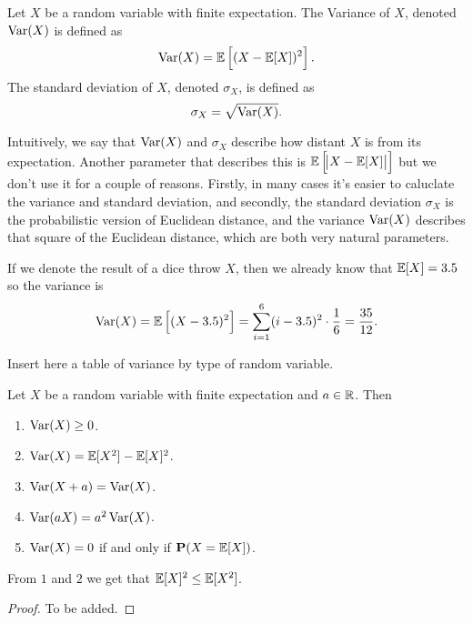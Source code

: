 \documentclass[11pt,a4paper]{article}
\begin{document}
  \begin{definition}
    Let $X$ be a random variable with finite expectation. The Variance of
    $X$, denoted $\operatorname{Var}(X)$ is defined as
    \[
      \operatorname{Var}(X) = \mathbb{E}\left[ (X - \mathbb{E}[X])^2 \right].
    \]
    The standard deviation of $X$, denoted $\sigma_X$, is defined as
    \[
      \sigma_X = \sqrt{\operatorname{Var}(X)}.
    \]
  \end{definition}
  
  Intuitively, we say that $\operatorname{Var}(X)$ and $\sigma_X$ describe how distant $X$
  is from its expectation. Another parameter that describes this is
  $\mathbb{E}\left[ \abs{X - \mathbb{E}[X]} \right]$ but we don't use it
  for a couple of reasons. Firstly, in many cases it's easier to caluclate
  the variance and standard deviation, and secondly, the standard deviation
  $\sigma_X$ is the probabilistic version of Euclidean distance, and the 
  variance $\operatorname{Var}(X)$ describes that square of the Euclidean distance, which
  are both very natural parameters.

  \begin{example}
    If we denote the result of a dice throw $X$, then we already know
    that $\mathbb{E}[X] = 3.5$ so the variance is
    \[
      \operatorname{Var}(X) =
      \mathbb{E}\left[ (X - 3.5)^2 \right] =
      \sum_{i=1}^{6} (i - 3.5)^2 \cdot \frac{1}{6} =
      \frac{35}{12}.
    \]
  \end{example}

  Insert here a table of variance by type of random variable.

  \begin{proposition}
    Let $X$ be a random variable with finite expectation and $a \in \mathbb{R}$. Then
    \begin{enumerate}
      \item $\operatorname{Var}(X) \geq 0$.
      \item $\operatorname{Var}(X) = \mathbb{E}[X^2] - \mathbb{E}[X]^2$.
      \item $\operatorname{Var}(X + a) = \operatorname{Var}(X)$.
      \item $\operatorname{Var}(aX) = a^2 \operatorname{Var}(X)$.
      \item $\operatorname{Var}(X) = 0$ if and only if $\mathbf{P}(X = \mathbb{E}[X])$.
    \end{enumerate}
    From $1$ and $2$ we get that $\mathbb{E}[X]^2 \le \mathbb{E}[X^2]$.
  \end{proposition}
  \begin{proof}
    To be added.
  \end{proof}
\end{document}
